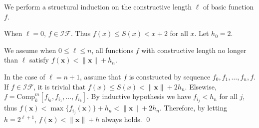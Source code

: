 \begin{pf} \rm
We perform a structural induction on the constructive length $\ell$ of basic function $f$.

When $\ell=0$, $f\in\mathcal{IF}$. Thus $f(x) \leq S(x) < x + 2$ for all $x$.
Let $h_0 = 2$.

We assume when $0\leq \ell \leq n$, all functions $f$ with constructive length
no longer than $\ell$ satisfy $f(\mathbf{x})<\|\mathbf{x}\|+h_n$.

In the case of $\ell = n + 1$, assume that $f$ is constructed by sequence $f_0,f_1,\ldots,f_n,f$.
If $f\in\mathcal{IF}$, it is trivial that $f(x) \leq S(x) < \|\mathbf{x}\|+2h_{n}$.
Elsewise, $f = \textrm{Comp}^m_k[f_{i_0},f_{i_1},\ldots,f_{i_k}]$.
By inductive hypothesis we have $f_{i_j} < h_n$ for all $j$, thus
$f(\mathbf{x}) < \max\{f_{i_j}(\mathbf{x})\} + h_n < \|\mathbf{x}\| + 2h_n$.
Therefore, by letting $h=2^{\ell + 1}$,  $f(\mathbf{x})<\|\mathbf{x}\|+h$ always
holds. \qed

\end{pf}

